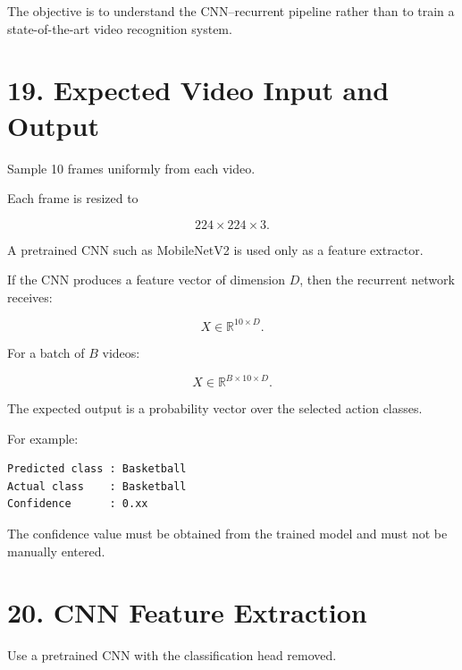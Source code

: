 \documentclass[10pt]{article}
\begin{document}
The objective is to understand the CNN--recurrent pipeline rather than to
train a state-of-the-art video recognition system.

\section*{19. Expected Video Input and Output}

Sample 10 frames uniformly from each video.

Each frame is resized to

\[
224\times224\times3.
\]

A pretrained CNN such as MobileNetV2 is used only as a feature extractor.

If the CNN produces a feature vector of dimension $D$, then the recurrent
network receives:

\[
X\in\mathbb{R}^{10\times D}.
\]

For a batch of $B$ videos:

\[
X\in\mathbb{R}^{B\times10\times D}.
\]

The expected output is a probability vector over the selected action classes.

For example:

\begin{verbatim}
Predicted class : Basketball
Actual class    : Basketball
Confidence      : 0.xx
\end{verbatim}

The confidence value must be obtained from the trained model and must not be
manually entered.

\section*{20. CNN Feature Extraction}

Use a pretrained CNN with the classification head removed.

\begin{center}
\end{center}
\end{document}
